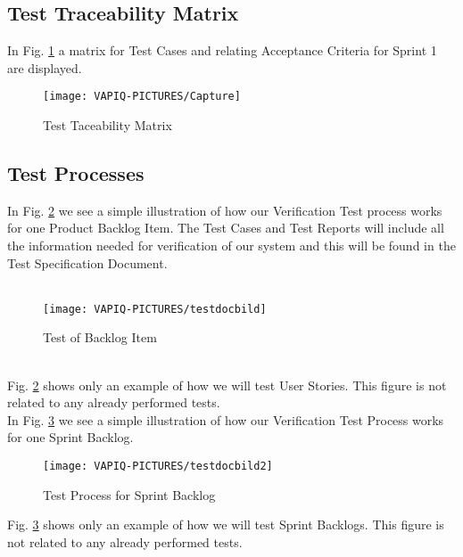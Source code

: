 \subsection{Test Traceability Matrix}
In Fig. \ref{fig:matrix} a matrix for Test Cases and relating Acceptance Criteria for Sprint 1 are displayed.

\begin{figure}[h]
    \centering
        \texttt{[image: VAPIQ-PICTURES/Capture]}
        \caption{Test Taceability Matrix}
        \label{fig:matrix}
\end{figure}

\newpage

\subsection{Test Processes}
In Fig. \ref{fig:testsetup} we see a simple illustration of how our Verification Test process works for one Product Backlog Item. The Test Cases and Test Reports will include all the information needed for verification of our system and this will be found in the Test Specification Document.\\
\\
\begin{figure}[h]
    \centering
        \texttt{[image: VAPIQ-PICTURES/testdocbild]}
        \caption{Test of Backlog Item}
        \label{fig:testsetup}
\end{figure}
\\
Fig. \ref{fig:testsetup} shows only an example of how we will test User Stories. This figure is not related to any already performed tests.\\

\newpage
In Fig. \ref{fig:testsetup2} we see a simple illustration of how our Verification Test Process works for one Sprint Backlog.

\begin{figure}[h]
    \centering
        \texttt{[image: VAPIQ-PICTURES/testdocbild2]}
        \caption{Test Process for Sprint Backlog}
        \label{fig:testsetup2}
\end{figure}
\noindent
Fig. \ref{fig:testsetup2} shows only an example of how we will test Sprint Backlogs. This figure is not related to any already performed tests.\\
\newpage